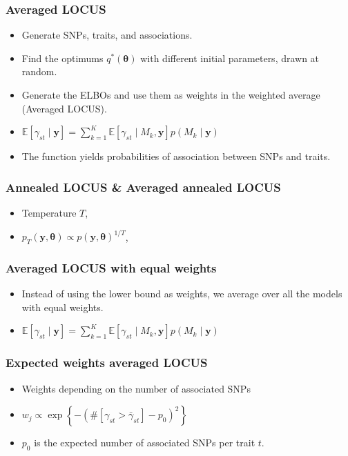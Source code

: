 \documentclass{beamer}
\newcommand*\mean[1]{\bar{#1}}
\begin{document}
\begin{frame}
\frametitle{Averaged LOCUS}
\begin{itemize}
\item Generate SNPs, traits, and associations.
\item Find the optimums $q^*(\boldsymbol{\theta})$ with different initial parameters, drawn at random.
\item Generate the ELBOs and use them as weights in the weighted average (Averaged LOCUS).
\item $\mathbb{E}\left[\gamma_{st}\mid \boldsymbol{y}\right]= \sum_{k=1}^K \mathbb{E}\left[\gamma_{st}\mid M_k,\boldsymbol{y}\right]p(M_k\mid\boldsymbol{y})$
\item The function yields probabilities of association between SNPs and traits.
\end{itemize}
\end{frame}

\begin{frame}
\frametitle{Annealed LOCUS \& Averaged annealed LOCUS}
\begin{itemize}
\item Temperature $T$,
\item $p_T(\boldsymbol{y},\boldsymbol{\theta}) \propto p(\boldsymbol{y},\boldsymbol{\theta})^{1/T}$,

\end{itemize}
\end{frame}

\begin{frame}
\frametitle{Averaged LOCUS with equal weights}
\begin{itemize}
\item Instead of using the lower bound as weights, we average over all the models with equal weights.
\item $\mathbb{E}\left[\gamma_{st}\mid \boldsymbol{y}\right]= \sum_{k=1}^K \mathbb{E}\left[\gamma_{st}\mid M_k,\boldsymbol{y}\right]p(M_k\mid\boldsymbol{y})$
\end{itemize}
\end{frame}

\begin{frame}
\frametitle{Expected weights averaged LOCUS}
\begin{itemize}
\item Weights depending on the number of associated SNPs
\item $w_j \propto \exp \left\lbrace-(\#\left[\gamma_{st} > \mean{\gamma}_{st}\right]-p_0)^2\right\rbrace$
\item $p_0$ is the expected number of associated SNPs per trait $t$.
\end{itemize}
\end{frame}
\end{document}

